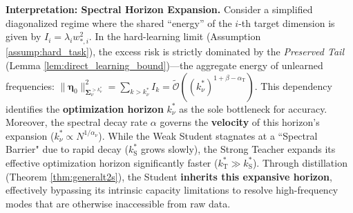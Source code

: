 \documentclass{article}
\theoremstyle{definition}
\theoremstyle{definition}
\theoremstyle{plain}
\theoremstyle{plain}
\theoremstyle{plain}
\theoremstyle{plain}
\theoremstyle{plain}
\newcommand{\bs}[1]{\boldsymbol{\mathbf{#1}}}
\newcommand{\te}{\mathrm{T}}
\newcommand{\st}{\mathrm{S}}
\newcommand{\Sig}{\mathbf{\Sigma}}
\begin{document}
\textbf{Interpretation: Spectral Horizon Expansion.}
Consider a simplified diagonalized regime where the shared ``energy'' of the $i$-th target dimension is given by $I_i = \lambda_i w_{*,i}^2$. 
In the hard-learning limit (Assumption \ref{assump:hard_task}), the excess risk is strictly dominated by the \textit{Preserved Tail} (Lemma \ref{lem:direct_learning_bound})—the aggregate energy of unlearned frequencies: $\|\bs\eta_0\|^2_{\Sig^{>k^*_\nu}_\nu}=\sum_{k > k^*_\nu} I_k = \tilde{\mathcal{O}}((k^*_\nu)^{1+\beta-\alpha_\te})$.
This dependency identifies the \textbf{optimization horizon} $k^*_\nu$ as the sole bottleneck for accuracy.
Moreover, the spectral decay rate $\alpha$ governs the \textbf{velocity} of this horizon's expansion ($k^*_\nu \propto N^{1/\alpha_\nu}$).
While the Weak Student stagnates at a ``Spectral Barrier" due to rapid decay ($k^*_\st$ grows slowly), the Strong Teacher expands its effective optimization horizon significantly faster ($k^*_\te \gg k^*_\st$).
Through distillation (Theorem \ref{thm:generalt2s}), the Student \textbf{inherits this expansive horizon}, effectively bypassing its intrinsic capacity limitations to resolve high-frequency modes that are otherwise inaccessible from raw data.

\end{document}
